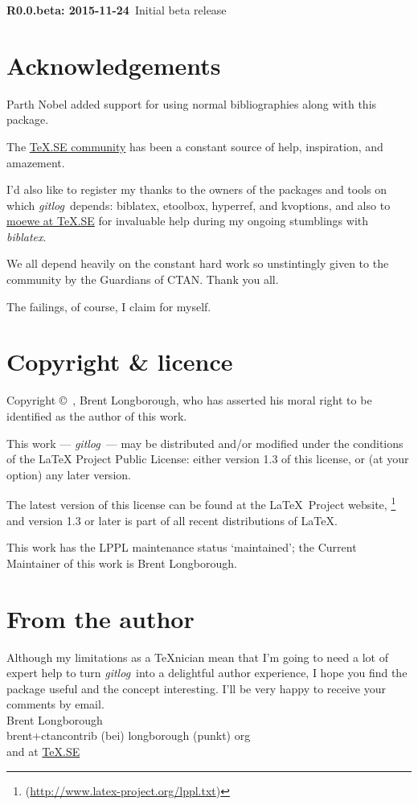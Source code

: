 \documentclass[a4paper,12pt,twoside,openany]{memoir}
\newcommand{\rpara}[1]{\par\noindent\textbf{#1}\,}
\newcommand{\sfit}[1]{\textit{#1}}
\newcommand{\tpname}{\sfit{gitlog}}
\begin{document}
\rpara{R0.0.beta: 2015-11-24}
Initial beta release

\section{Acknowledgements}

Parth Nobel added support for using normal bibliographies along with this package.

The \href{http://tex.stackexchange.com}{\TeX.SE community}
has been a constant source of help, inspiration, and amazement.

I'd also like to register my thanks to the owners of the packages and tools 
on which \tpname\ depends: 
biblatex, etoolbox, hyperref, and kvoptions,
and also to 
\href{http://tex.stackexchange.com/users/35864/moewe}{moewe at \TeX.SE} for
invaluable help during my ongoing stumblings with \sfit{biblatex}.

We all depend heavily on the constant hard work
so unstintingly given to the community by the Guardians of CTAN. 
Thank you all.

The failings, of course, I claim for myself.

\section{Copyright \& licence}
Copyright \copyright\ , Brent Longborough,
who has asserted his moral right
to be identified as the author of this work.

This work --- \tpname\ --- may be distributed and/or modified under the
conditions of the LaTeX Project Public License: either version 1.3
of this license, or (at your option) any later version.

The latest version of this license can be found
at the \LaTeX\ Project website,%
\footnote{(\url{http://www.latex-project.org/lppl.txt})}
and version 1.3 or later is part of all recent distributions of
\LaTeX.

This work has the LPPL maintenance status `maintained';
the Current Maintainer of this work is Brent Longborough.


\section{From the author}
Although my limitations as a \TeX nician
mean that I'm going to need a lot of expert help
to turn \tpname\ into a delightful author experience,
I hope you find the package useful and the concept interesting.
I'll be very happy to receive your comments by email.\\[\baselineskip]
Brent Longborough\\[\baselineskip]
\textsf{brent+ctancontrib (bei) longborough (punkt) org}\\
and at \href{http://tex.stackexchange.com/users/344/brent-longborough}{\TeX.SE}

\printGitLog
\end{document}
